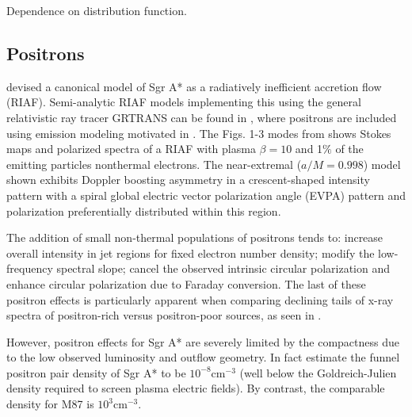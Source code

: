 Dependence on distribution function.



\subsection{Positrons}


\cite{2006MNRAS.367..905B} devised a canonical model of Sgr A* as a  radiatively inefficient accretion flow (RIAF). Semi-analytic RIAF models implementing  this using the general relativistic ray tracer GRTRANS \citep{2016MNRAS.462..115D} can be found in  \cite{2021arXiv210105327E}, where  positrons are included using emission modeling motivated in  \cite{2020ApJ...896...30A}. The Figs. 1-3 %
modes from \cite{2021arXiv210105327E}  shows Stokes maps and polarized spectra of a \cite{2006MNRAS.367..905B} RIAF with plasma $\beta=10$ and 1$\%$ of the emitting particles nonthermal electrons. The near-extremal ($a/M=0.998$) model shown exhibits Doppler boosting asymmetry in a crescent-shaped intensity pattern with a spiral global electric vector polarization angle (EVPA) pattern and polarization preferentially distributed within this region.

The addition of small non-thermal populations of positrons \citep{2020ApJ...896...30A,2021arXiv210105327E} tends to: increase overall intensity in jet regions for fixed electron number density; modify the low-frequency spectral slope; cancel the observed intrinsic circular polarization and enhance circular polarization due to Faraday conversion. The last of these positron effects is particularly apparent when comparing declining tails of x-ray spectra of positron-rich versus positron-poor sources, as seen in \cite{2021arXiv210105327E}.%

However, positron effects for Sgr A* are severely limited by the compactness \citep{2012MNRAS.424L..26G} due to the low observed luminosity and outflow geometry. In fact \cite{2011ApJ...735....9M} estimate the funnel positron pair density of Sgr A* to be $10^{-8}\mathrm{cm}^{-3}$ (well below the Goldreich-Julien density required to screen plasma electric fields). By contrast, the comparable density for M87 is $10^3\mathrm{cm}^{-3}$.

